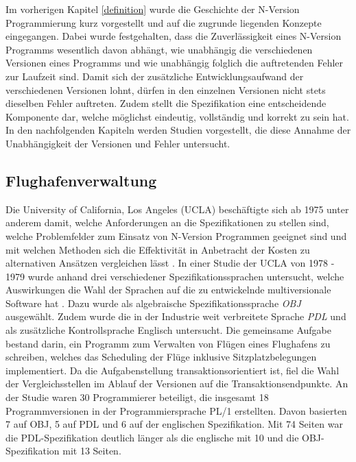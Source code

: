 %
Im vorherigen Kapitel \ref{definition} wurde die Geschichte der N-Version Programmierung kurz vorgestellt und auf die zugrunde liegenden Konzepte eingegangen.
Dabei wurde festgehalten, dass die Zuverlässigkeit eines N-Version Programms wesentlich davon abhängt, wie unabhängig die verschiedenen Versionen eines Programms und wie unabhängig folglich die auftretenden Fehler zur Laufzeit sind. Damit sich der zusätzliche Entwicklungsaufwand der verschiedenen Versionen lohnt, dürfen in den einzelnen Versionen nicht stets dieselben Fehler auftreten.
Zudem stellt die Spezifikation eine entscheidende Komponente dar, welche möglichst eindeutig, vollständig und korrekt zu sein hat.
In den nachfolgenden Kapiteln werden Studien vorgestellt, die diese Annahme der Unabhängigkeit der Versionen und Fehler untersucht.
%
\subsection{Flughafenverwaltung}\label{uclastudies}
Die University of California, Los Angeles (UCLA) beschäftigte sich ab 1975 unter anderem damit, welche Anforderungen an die Spezifikationen zu stellen sind, welche Problemfelder zum Einsatz von N-Version Programmen geeignet sind und mit welchen Methoden sich die Effektivität in Anbetracht der Kosten zu alternativen Ansätzen vergleichen lässt \cite{Avizienis:1985:NAF:1314034.1314064}.
In einer Studie der UCLA von 1978 - 1979 wurde anhand drei verschiedener Spezifikationssprachen untersucht, welche Auswirkungen die Wahl der Sprachen auf die zu entwickelnde multiversionale Software hat \cite{methodology}.
Dazu wurde als algebraische Spezifikationssprache \emph{OBJ} ausgewählt. Zudem wurde die in der Industrie weit verbreitete Sprache \emph{PDL} und als zusätzliche Kontrollsprache Englisch untersucht.
Die gemeinsame Aufgabe bestand darin, ein Programm zum Verwalten von Flügen eines Flughafens zu schreiben, welches das Scheduling der Flüge inklusive Sitzplatzbelegungen implementiert.
Da die Aufgabenstellung transaktionsorientiert ist, fiel die Wahl der Vergleichsstellen im Ablauf der Versionen auf die Transaktionsendpunkte.
An der Studie waren 30 Programmierer beteiligt, die insgesamt 18 Programmversionen in der Programmiersprache PL/1 erstellten.
Davon basierten 7 auf OBJ, 5 auf PDL und 6 auf der englischen Spezifikation.
Mit 74 Seiten war die PDL-Spezifikation deutlich länger als die englische mit 10 und die OBJ-Spezifikation mit 13 Seiten.
%

